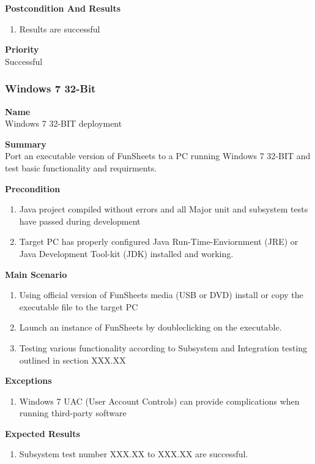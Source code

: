 \documentclass[12pt]{article}
\begin{document}
{\bf Postcondition And Results}\
\begin{enumerate}
\item Results are successful
\end{enumerate}

\noindent
{\bf Priority}\\
Successful
\noindent

\clearpage
\subsubsection{Windows 7 32-Bit} \label{uc:1}

\noindent
{\bf Name}\\
Windows 7 32-BIT deployment

\noindent
{\bf Summary}\\
Port an executable version of FunSheets to a PC running Windows 7 32-BIT and test basic functionality and requirments.

\noindent
{\bf Precondition}\\
\begin{enumerate}
\item Java project compiled without errors and all Major unit and subsystem tests have passed during development
\item Target PC has properly configured Java Run-Time-Enviornment (JRE) or Java Development Tool-kit (JDK) installed and working.
\end{enumerate}

\noindent
{\bf Main Scenario}\
\vspace*{-0.2in}
\begin{enumerate}
\item Using official version of FunSheets media (USB or DVD) install or copy the executable file to the target PC
\item Launch an instance of FunSheets by doubleclicking on the executable.
\item Testing various functionality according to Subsystem and Integration testing outlined in section XXX.XX
\end{enumerate}

{\bf Exceptions}\
\begin{enumerate}
\item Windows 7 UAC (User Account Controls) can provide complications when running third-party software
\end{enumerate}
{\bf Expected Results}\
\begin{enumerate}
\item Subsystem test number XXX.XX to XXX.XX are successful.
\end{enumerate}
\end{document}
